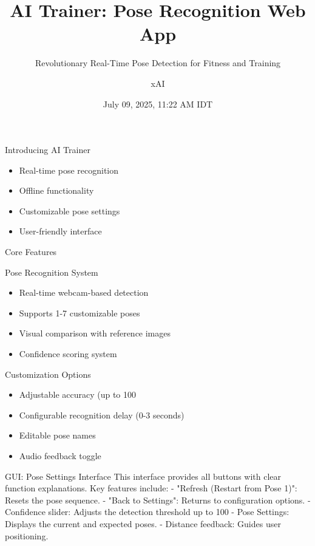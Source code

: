 \documentclass[11pt]{beamer}
\title{AI Trainer: Pose Recognition Web App}
\subtitle{Revolutionary Real-Time Pose Detection for Fitness and Training}
\author{xAI}
\date{July 09, 2025, 11:22 AM IDT}
\begin{document}
\begin{frame}
    \titlepage
\end{frame}

\begin{frame}{Introducing AI Trainer}
    \begin{itemize}
        \item Real-time pose recognition
        \item Offline functionality
        \item Customizable pose settings
        \item User-friendly interface
    \end{itemize}
\end{frame}

\begin{frame}{Core Features}
    \begin{block}{Pose Recognition System}
        \begin{itemize}
            \item Real-time webcam-based detection
            \item Supports 1-7 customizable poses
            \item Visual comparison with reference images
            \item Confidence scoring system
        \end{itemize}
    \end{block}
    \begin{block}{Customization Options}
        \begin{itemize}
            \item Adjustable accuracy (up to 100%
            \item Configurable recognition delay (0-3 seconds)
            \item Editable pose names
            \item Audio feedback toggle
        \end{itemize}
    \end{block}
\end{frame}

\begin{frame}{GUI: Pose Settings Interface}
    \small{This interface provides all buttons with clear function explanations. Key features include:
    - "Refresh (Restart from Pose 1)": Resets the pose sequence.
    - "Back to Settings": Returns to configuration options.
    - Confidence slider: Adjusts the detection threshold up to 100%
    - Pose Settings: Displays the current and expected poses.
    - Distance feedback: Guides user positioning.}
\end{frame}
\end{document}

